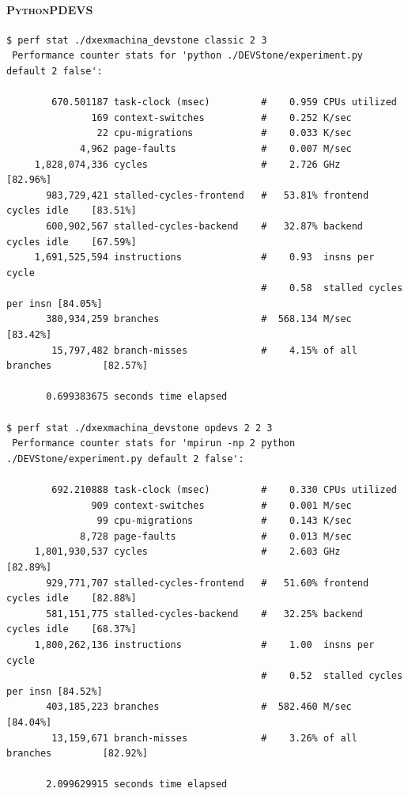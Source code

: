 \documentclass[8pt,a4paper]{report}
\begin{document}
\paragraph{\textsc{PythonPDEVS}}
\begin{Verbatim}[fontsize=\small]
$ perf stat ./dxexmachina_devstone classic 2 3
 Performance counter stats for 'python ./DEVStone/experiment.py default 2 false':

        670.501187 task-clock (msec)         #    0.959 CPUs utilized          
               169 context-switches          #    0.252 K/sec                  
                22 cpu-migrations            #    0.033 K/sec                  
             4,962 page-faults               #    0.007 M/sec                  
     1,828,074,336 cycles                    #    2.726 GHz                     [82.96%]
       983,729,421 stalled-cycles-frontend   #   53.81% frontend cycles idle    [83.51%]
       600,902,567 stalled-cycles-backend    #   32.87% backend  cycles idle    [67.59%]
     1,691,525,594 instructions              #    0.93  insns per cycle        
                                             #    0.58  stalled cycles per insn [84.05%]
       380,934,259 branches                  #  568.134 M/sec                   [83.42%]
        15,797,482 branch-misses             #    4.15% of all branches         [82.57%]

       0.699383675 seconds time elapsed
       
$ perf stat ./dxexmachina_devstone opdevs 2 2 3
 Performance counter stats for 'mpirun -np 2 python ./DEVStone/experiment.py default 2 false':

        692.210888 task-clock (msec)         #    0.330 CPUs utilized          
               909 context-switches          #    0.001 M/sec                  
                99 cpu-migrations            #    0.143 K/sec                  
             8,728 page-faults               #    0.013 M/sec                  
     1,801,930,537 cycles                    #    2.603 GHz                     [82.89%]
       929,771,707 stalled-cycles-frontend   #   51.60% frontend cycles idle    [82.88%]
       581,151,775 stalled-cycles-backend    #   32.25% backend  cycles idle    [68.37%]
     1,800,262,136 instructions              #    1.00  insns per cycle        
                                             #    0.52  stalled cycles per insn [84.52%]
       403,185,223 branches                  #  582.460 M/sec                   [84.04%]
        13,159,671 branch-misses             #    3.26% of all branches         [82.92%]

       2.099629915 seconds time elapsed
\end{Verbatim}
\end{document}
